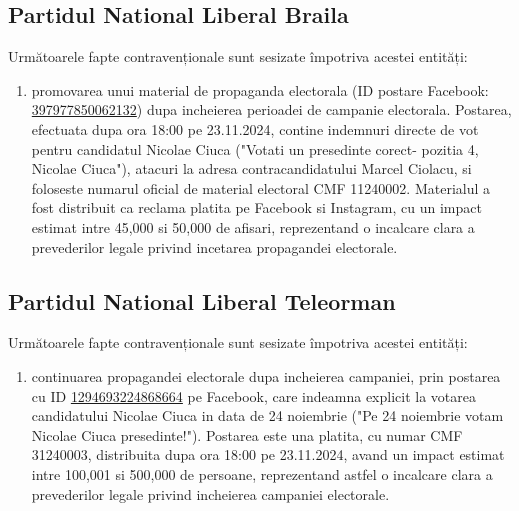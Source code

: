 \documentclass[a4paper,12pt]{article}
\begin{document}
\vspace{0.5cm}

\subsection{Partidul National Liberal Braila}
Următoarele fapte contravenționale sunt sesizate împotriva acestei entități:

\begin{enumerate}[leftmargin=*, label=\arabic*.)]
    \item promovarea unui material de propaganda electorala (ID postare Facebook: \href{https://www.facebook.com/ads/library/?id=397977850062132}{397977850062132}) dupa incheierea perioadei de campanie electorala. Postarea, efectuata dupa ora 18:00 pe 23.11.2024, contine indemnuri directe de vot pentru candidatul Nicolae Ciuca ("Votati un presedinte corect- pozitia 4, Nicolae Ciuca"), atacuri la adresa contracandidatului Marcel Ciolacu, si foloseste numarul oficial de material electoral CMF 11240002. Materialul a fost distribuit ca reclama platita pe Facebook si Instagram, cu un impact estimat intre 45,000 si 50,000 de afisari, reprezentand o incalcare clara a prevederilor legale privind incetarea propagandei electorale.
\end{enumerate}

\vspace{0.5cm}

\subsection{Partidul National Liberal Teleorman}
Următoarele fapte contravenționale sunt sesizate împotriva acestei entități:

\begin{enumerate}[leftmargin=*, label=\arabic*.)]
    \item continuarea propagandei electorale dupa incheierea campaniei, prin postarea cu ID \href{https://www.facebook.com/ads/library/?id=1294693224868664}{1294693224868664} pe Facebook, care indeamna explicit la votarea candidatului Nicolae Ciuca in data de 24 noiembrie ("Pe 24 noiembrie votam Nicolae Ciuca presedinte!"). Postarea este una platita, cu numar CMF 31240003, distribuita dupa ora 18:00 pe 23.11.2024, avand un impact estimat intre 100,001 si 500,000 de persoane, reprezentand astfel o incalcare clara a prevederilor legale privind incheierea campaniei electorale.
\end{enumerate}
\end{document}
